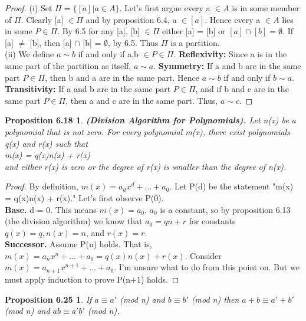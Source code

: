 \documentclass[12pt]{amsart}
\begin{document}
\begin{proof}
	(i) Set $\Pi = \{[a] | a \in A\}$. Let's first argue every a $\in A$ is in some member of $\Pi$. Clearly [a] $\in \Pi$ and by proposition 6.4, a $\in [a]$. Hence every a $\in A$ lies in some $P \in \Pi$. By 6.5 for any [a], [b] $\in \Pi$ either [a] = [b] or $[a] \cap [b] = \emptyset$. If [a] $\neq$ [b], then [a] $\cap$ [b] = $\emptyset$, by 6.5. Thus $\Pi$ is a partition.
	\\(ii) We define $a \sim b$ if and only if a,b $\in P \in \Pi$. \textbf{Reflexivity:} Since a is in the same part of the partition as itself, $a \sim a$. \textbf{Symmetry:} If a and b are in the same part $P \in \Pi$, then b and a are in the same part. Hence $a \sim b$ if and only if $b \sim a$. \textbf{Transitivity:} If a and b are in the same part $P \in \Pi$, and if b and c are in the same part $P \in \Pi$, then a and c are in the same part. Thus, $a \sim c$.
\end{proof}

\newtheorem*{prop6.18}{Proposition 6.18}
\begin{prop6.18}\textbf{(Division Algorithm for Polynomials).}
	Let n(x) be a polynomial that is not zero. For every polynomial m(x), there exist polynomials q(x) and r(x) such that\\\indent m(x) = q(x)n(x) + r(x)\\ and either r(x) is zero or the degree of r(x) is smaller than the degree of n(x).
\end{prop6.18}

\begin{proof}
	By definition, $m(x) = a_{d}x^{d}+\dots+a_{0}$. Let P(d) be the statement "m(x) = q(x)n(x) + r(x)." Let's first observe P(0).
	\\\textbf{Base.} d = 0. This means $m(x) = a_{0}$. $a_0$ is a constant, so by proposition 6.13 (the division algorithm) we know that $a_0 = qn + r$ for constants $q(x) = q, n(x) = n$, and $r(x) = r$.
	\\\textbf{Successor.} Assume P(n) holds. That is, $m(x) = a_{n}x^{n}+\dots+a_{0} = q(x)n(x) + r(x)$. Consider $m(x) = a_{n+1}x^{n+1}+\dots+a_{0}$. I'm unsure what to do from this point on. But we must apply induction to prove P(n+1) holds.
\end{proof}

\newtheorem*{prop6.25}{Proposition 6.25}
\begin{prop6.25}
	If $a \equiv a' $ (mod n) and $b \equiv b' $ (mod n) then $a + b \equiv a' + b' $ (mod n) and $ab \equiv a'b' $ (mod n).
\end{prop6.25}
\end{document}
